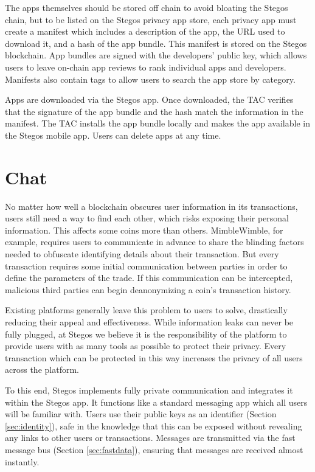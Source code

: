 \documentclass[8pt,fleqn,openany]{book}
\begin{document}
The apps themselves should be stored off chain to avoid bloating the Stegos chain, but to be listed on the Stegos privacy app store, each privacy app must create a manifest which includes a description of the app, the URL used to download it, and a hash of the app bundle. This manifest is stored on the Stegos blockchain. App bundles are signed with the developers' public key, which allows users to leave on-chain app reviews to rank individual apps and developers. Manifests also contain tags to allow users to search the app store by category.

Apps are downloaded via the Stegos app. Once downloaded, the TAC verifies that the signature of the app bundle and the hash match the information in the manifest. The TAC installs the app bundle locally and makes the app available in the Stegos mobile app. Users can delete apps at any time.

\section{Chat}\label{sec:chat}
No matter how well a blockchain obscures user information in its transactions, users still need a way to find each other, which risks exposing their personal information. This affects some coins more than others. MimbleWimble, for example, requires users to communicate in advance to share the blinding factors needed to obfuscate identifying details about their transaction. But every transaction requires some initial communication between parties in order to define the parameters of the trade. If this communication can be intercepted, malicious third parties can begin deanonymizing a coin’s transaction history. 

Existing platforms generally leave this problem to users to solve, drastically reducing their appeal and effectiveness. While information leaks can never be fully plugged, at Stegos we believe it is the responsibility of the platform to provide users with as many tools as possible to protect their privacy. Every transaction which can be protected in this way increases the privacy of all users across the platform.

To this end, Stegos implements fully private communication and integrates it within the Stegos app. It functions like a standard messaging app which all users will be familiar with. Users use their public keys as an identifier (Section \ref{sec:identity}), safe in the knowledge that this can be exposed without revealing any links to other users or transactions. Messages are transmitted via the fast message bus (Section \ref{sec:fastdata}), ensuring that messages are received almost instantly.
\end{document}
